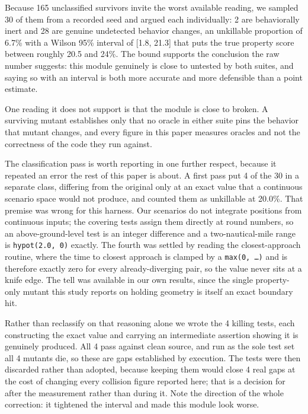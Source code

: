 \documentclass[12pt]{article}
\begin{document}
Because 165 unclassified survivors invite the worst available reading, we sampled
30 of them from a recorded seed and argued each individually: 2 are behaviorally
inert and 28 are genuine undetected behavior changes, an unkillable proportion of
6.7\% with a Wilson 95\% interval of [1.8, 21.3] that puts the true
property score between roughly 20.5 and 24\%. The bound supports the
conclusion the raw number suggests: this module genuinely is close to untested by
both suites, and saying so with an interval is both more accurate and more
defensible than a point estimate.

One reading it does not support is that the module is close to broken. A surviving
mutant establishes only that no oracle in either suite pins the behavior that
mutant changes, and every figure in this paper measures oracles and not the correctness of the code they run against.

The classification pass is worth reporting in one further respect, because it
repeated an error the rest of this paper is about. A first pass put 4 of the 30
in a separate class, differing from the original only at an exact value that a
continuous scenario space would not produce, and counted them as unkillable at
20.0\%. That premise was wrong for this harness. Our scenarios do not
integrate positions from continuous inputs; the covering tests assign them directly
at round numbers, so an above-ground-level test is an integer difference and a
two-nautical-mile range is \texttt{hypot(2.0, 0)} exactly. The fourth was settled by
reading the closest-approach routine, where the time to closest approach is clamped
by a \texttt{max(0, \dots)} and is therefore exactly zero for every already-diverging pair, so the value never sits at a knife edge. The tell was available in our
own results, since the single property-only mutant this study reports on holding geometry
is itself an exact boundary hit.

Rather than reclassify on that reasoning alone we wrote the 4 killing tests, each
constructing the exact value and carrying an intermediate assertion showing it is
genuinely produced. All 4 pass against clean source, and run as the sole test set
all 4 mutants die, so these are gaps established by execution. The
tests were then discarded rather than adopted, because keeping them would close 4 real gaps at the cost of changing every collision figure reported here; that is a
decision for after the measurement rather than during it. Note the direction of the
whole correction: it tightened the interval and made this module look worse.
\end{document}
